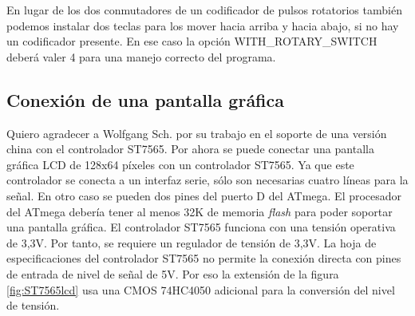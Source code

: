 En lugar de  los dos conmutadores de un codificador  de pulsos rotatorios también podemos instalar  dos teclas para los
mover hacia arriba y hacia abajo, si no hay un codificador presente. En ese caso la opción WITH\_ROTARY\_SWITCH deberá
valer 4 para una manejo correcto del programa.

\subsection{Conexión de una pantalla gráfica}

Quiero agradecer a Wolfgang Sch. por su trabajo en el soporte de una versión china con el controlador ST7565. Por ahora
se puede conectar  una pantalla gráfica LCD  de 128x64 píxeles con un  controlador ST7565. Ya que  este controlador se
conecta a un interfaz  serie, sólo son necesarias cuatro líneas  para la señal. En otro caso se  pueden dos pines del
puerto D del ATmega. El procesador del ATmega debería  tener al menos 32K de memoria \textit{flash} para poder soportar
una pantalla  gráfica. El controlador ST7565  funciona con una  tensión operativa de  3,3V. Por tanto, se  requiere un
regulador de tensión  de 3,3V. La hoja de especificaciones  del controlador ST7565 no permite la  conexión directa con
pines de entrada de nivel de señal de 5V. Por  eso la extensión de la figura \ref{fig:ST7565lcd} usa una CMOS 74HC4050
adicional para la conversión del nivel de tensión.

